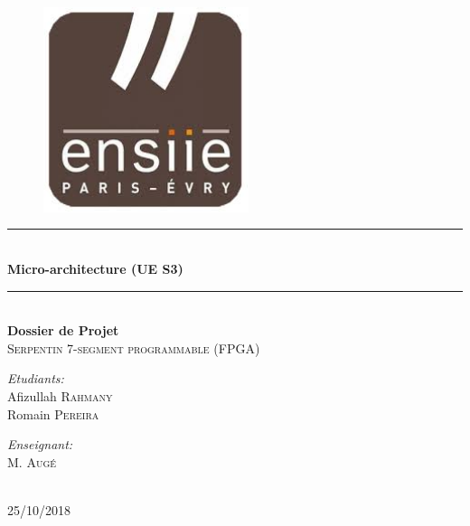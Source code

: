\documentclass[10pt]{article}
\newcommand{\HRule}{\rule{\linewidth}{0.5mm}}
\begin{document}
    
    \begin{titlepage}
        \begin{sffamily}
            \begin{center}

                \begin{figure}[h!]
                    \includegraphics[width=6cm]{ensiie.jpeg}
                \end{figure}

                \HRule \\[0.8cm]
                { \huge \bfseries Micro-architecture (UE S3) } \\[0.4cm]
                \HRule \\[2.0cm]
                
                { \huge \bfseries Dossier de Projet } \\[0.5cm]

                \textsc{\Large Serpentin 7-segment programmable (FPGA)}\\[2.0cm]

                \vfill
                \begin{minipage}{0.4\textwidth}
                    \begin{flushleft} \large
                        \emph{Etudiants:} \\
                        Afizullah \textsc{Rahmany}\\
                        Romain \textsc{Pereira}\\
                    \end{flushleft}
                \end{minipage}
                \begin{minipage}{0.4\textwidth}
                    \begin{flushright} \large
                        \emph{Enseignant:}  \\
                        M. \textsc{Augé}
                    \end{flushright}
                \end{minipage}
                \\[2.0cm]
                {\large 25/10/2018}
            \end{center}
        \end{sffamily}
    \end{titlepage}
    
\end{document}
